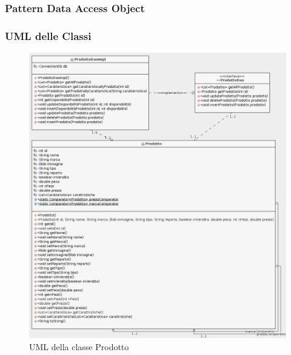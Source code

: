 \documentclass{article}
\begin{document}
\subsubsection{Pattern Data Access Object}
\subsubsection{UML delle Classi}
\begin{figure}[h!]
	\centering
	\includegraphics[width=\textwidth]{UmlProdotto.png}
	\caption{UML della classe Prodotto}
	\label{fig:UmlProdotto}
\end{figure}
\end{document}
